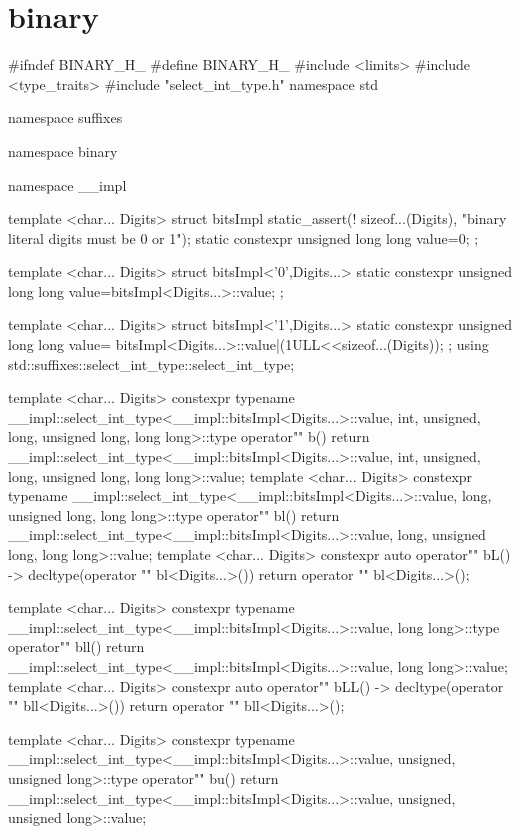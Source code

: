 \documentclass[ebook,11pt,article]{memoir}
\begin{document}
\section{binary}
\begin{codeblock}
#ifndef BINARY_H_
#define BINARY_H_
#include <limits>
#include <type_traits>
#include "select_int_type.h"
namespace std{
namespace suffixes{
namespace binary{
namespace __impl{

template <char... Digits>
struct bitsImpl{
    static_assert(! sizeof...(Digits),
            "binary literal digits must be 0 or 1");
    static constexpr unsigned long long value=0;
};

template <char... Digits>
struct bitsImpl<'0',Digits...>{
    static constexpr unsigned long long value=bitsImpl<Digits...>::value;
};

template <char... Digits>
struct bitsImpl<'1',Digits...>{
    static constexpr unsigned long long value=
            bitsImpl<Digits...>::value|(1ULL<<sizeof...(Digits));
};
using std::suffixes::select_int_type::select_int_type;
}


template <char... Digits>
constexpr typename
__impl::select_int_type<__impl::bitsImpl<Digits...>::value,
      int, unsigned, long, unsigned long, long long>::type
operator"" b(){
    return    __impl::select_int_type<__impl::bitsImpl<Digits...>::value,
            int, unsigned, long, unsigned long, long long>::value;
}
template <char... Digits>
constexpr typename
__impl::select_int_type<__impl::bitsImpl<Digits...>::value,
      long, unsigned long, long long>::type
operator"" bl(){
    return    __impl::select_int_type<__impl::bitsImpl<Digits...>::value,
                  long, unsigned long, long long>::value;
}
template <char... Digits>
constexpr auto
operator"" bL() -> decltype(operator "" bl<Digits...>()){
    return     operator "" bl<Digits...>();
}

template <char... Digits>
constexpr typename
__impl::select_int_type<__impl::bitsImpl<Digits...>::value,
       long long>::type
operator"" bll(){
    return     __impl::select_int_type<__impl::bitsImpl<Digits...>::value,
                  long long>::value;
}
template <char... Digits>
constexpr auto
operator"" bLL() -> decltype(operator "" bll<Digits...>()){
    return     operator "" bll<Digits...>();
}

template <char... Digits>
constexpr typename
__impl::select_int_type<__impl::bitsImpl<Digits...>::value,
      unsigned, unsigned long>::type
operator"" bu(){
    return     __impl::select_int_type<__impl::bitsImpl<Digits...>::value,
                  unsigned, unsigned long>::value;
}

}}}
\end{codeblock}
\end{document}
